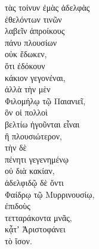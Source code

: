 {\large
\begin{greek}
\noindent τὰς τοίνυν ἐμὰς ἀδελφὰς \\
\tabto{2em} ἐθελόντων τινῶν \\
\tabto{4em} λαβεῖν ἀπροίκους \\
\tabto{2em} πάνυ πλουσίων \\
οὐκ ἔδωκεν, \\
\tabto{2em} ὅτι ἐδόκουν \\
\tabto{4em} κάκιον γεγονέναι, \\
ἀλλὰ τὴν μὲν \\
\tabto{2em} Φιλομήλῳ τῷ Παιανιεῖ, \\
\tabto{4em} ὃν οἱ πολλοὶ \\
\tabto{4em} βελτίω ἡγοῦνται εἶναι\\
\tabto{4em} ἢ πλουσιώτερον, \\
τὴν δὲ \\
\tabto{2em} πένητι γεγενημένῳ \\
\tabto{4em} οὐ διὰ κακίαν, \\
\tabto{2em} ἀδελφιδῷ δὲ ὄντι \\
\tabto{2em} Φαίδρῳ τῷ Μυρρινουσίῳ, \\
ἐπιδοὺς \\
\tabto{2em} τετταράκοντα μνᾶς, \\
κᾆτʼ Ἀριστοφάνει \\
\tabto{2em} τὸ ἴσον.\\

\end{greek}
}


